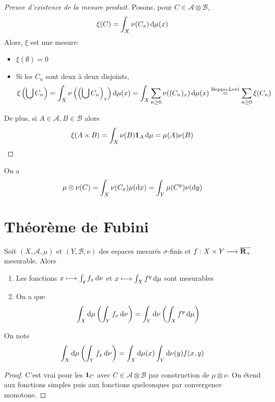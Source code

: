 \begin{proof}[Preuve d'existence de la mesure produit]
Posons, pour $C \in  \mathcal  A\otimes \mathcal  B$, \[
    \xi(C)=\int_X \nu(C_x)\mathop{}\!\mathrm d \mu(x)
\] 
Alors, $\xi$ est une mesure:  \begin{itemize}
    \item $\xi(\emptyset ) = 0$
    \item Si les  $C_n$ sont deux à deux disjoints,  \[
            \xi \left(  \bigcup C_n\right)=\int_X \nu \left(  \left(\bigcup C_n\right)_x\right)\mathop{}\!\mathrm d\mu(x)=\int_X \sum_{n\geq 0} \nu((C_n)_x)\mathop{}\!\mathrm d\mu(x)\overset{\text{Beppo-Levi}}=\sum_{n\geq 0}\xi(C_n)
    \] 
\end{itemize}
    De plus, si $A \in  \mathcal A, B \in  \mathcal  B$ alors \[
        \xi(A\times B)=\int_X\nu(B)\bm{1}_A\mathop{}\!\mathrm d\mu=\mu(A)\nu(B)
    \] 
\end{proof}

\begin{cor}
On a \[
    \mu\otimes \nu(C)=\int_X \nu(C_x)\mu(\mathop{}\!\mathrm d x)=\int_Y\mu(C^y)\nu(\mathop{}\!\mathrm d y)
\] 
\end{cor}

\section{Théorème de Fubini}

\begin{thm}
    Soit $(X, \mathcal  A, \mu)$ et $(Y, \mathcal  B, \nu)$ des espaces mesurés $\sigma$-finis et $f:X\times Y\longrightarrow \overline{\mathbf R_+}$ mesurable. Alors \begin{enumerate}
        \item Les fonctions $x \longmapsto \int_y f_x\mathop{}\!\mathrm d \nu$ et $x \longmapsto \int_X f^y\mathop{}\!\mathrm d \mu$ sont mesurables
        \item On a que \[
                \int_X \mathop{}\!\mathrm d\mu \left( \int_Y f_x\mathop{}\!\mathrm d \nu \right)=\int_Y \mathop{}\!\mathrm d\nu \left( \int_X f^y\mathop{}\!\mathrm d \mu \right)
        \] 
    \end{enumerate}
\end{thm}

\begin{rem}
On note \[
    \int_X\mathop{}\!\mathrm d \mu \left(  \int_Y f_x\mathop{}\!\mathrm d \nu\right) = \int_X \mathop{}\!\mathrm d\mu(x) \int _Y \mathop{}\!\mathrm d\nu(y) f(x, y)
\] 
\end{rem}

\begin{proof}
C'est vrai pour les $\bm{1}_C$ avec  $C \in  \mathcal  A\otimes \mathcal  B$ par construction de $\mu\otimes \nu$. On étend aux fonctions simples puis aux fonctions quelconques par convergence monotone.
\end{proof}

